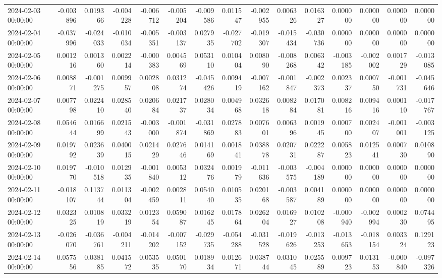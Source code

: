 \begin{tabular}{lrrrrrrrrrrrrrr}
2024-02-03 00:00:00 & -0.003896 & 0.019366 & -0.004228 & -0.006712 & -0.005204 & -0.009586 & 0.011547 & -0.002955 & 0.006326 & 0.016327 & 0.000000 & 0.000000 & 0.000000 & 0.000000 \\
2024-02-04 00:00:00 & -0.037996 & -0.024033 & -0.010034 & -0.005351 & -0.003137 & 0.027935 & -0.027702 & -0.019307 & -0.015434 & -0.030736 & 0.000000 & 0.000000 & 0.000000 & 0.000000 \\
2024-02-05 00:00:00 & 0.001216 & 0.001360 & 0.002214 & -0.000383 & 0.004569 & 0.053110 & 0.010404 & 0.008090 & -0.008268 & 0.006342 & -0.003185 & -0.002002 & 0.001729 & -0.013085 \\
2024-02-06 00:00:00 & 0.008871 & -0.001275 & 0.009957 & 0.002808 & 0.031274 & -0.045426 & 0.009419 & -0.007162 & -0.001847 & -0.002373 & 0.002337 & 0.000750 & -0.001731 & -0.045646 \\
2024-02-07 00:00:00 & 0.007798 & 0.022410 & 0.028540 & 0.020684 & 0.021737 & 0.028034 & 0.004968 & 0.032618 & 0.008284 & 0.017081 & 0.008216 & 0.009416 & 0.000110 & -0.017767 \\
2024-02-08 00:00:00 & 0.054644 & 0.016699 & 0.021543 & -0.003000 & -0.001874 & -0.031869 & 0.027883 & 0.007601 & 0.006396 & 0.001945 & 0.000700 & 0.002407 & -0.001001 & -0.003125 \\
2024-02-09 00:00:00 & 0.019792 & 0.023639 & 0.040015 & 0.021429 & 0.027646 & 0.014169 & 0.001841 & 0.038878 & 0.020731 & 0.022287 & 0.005823 & 0.012541 & 0.000730 & 0.010890 \\
2024-02-10 00:00:00 & 0.019770 & -0.010518 & 0.012935 & -0.001840 & 0.005312 & 0.032476 & 0.001979 & -0.011636 & -0.003575 & -0.004189 & 0.000000 & 0.000000 & 0.000000 & 0.000000 \\
2024-02-11 00:00:00 & -0.018107 & 0.113744 & 0.011304 & -0.002459 & 0.002811 & 0.054040 & 0.010535 & 0.020168 & -0.003587 & 0.004189 & 0.000000 & 0.000000 & 0.000000 & 0.000000 \\
2024-02-12 00:00:00 & 0.032325 & 0.010819 & 0.033219 & 0.012354 & 0.059087 & 0.016245 & 0.017864 & 0.026204 & 0.016927 & 0.010208 & -0.000940 & -0.002994 & 0.000230 & 0.074495 \\
2024-02-13 00:00:00 & -0.026070 & -0.036761 & -0.004211 & -0.014202 & -0.007152 & -0.029735 & -0.054288 & -0.031528 & -0.019626 & -0.013253 & -0.013653 & -0.018154 & 0.003324 & 0.129123 \\
2024-02-14 00:00:00 & 0.057556 & 0.038185 & 0.041572 & 0.053535 & 0.050170 & 0.018934 & 0.012671 & 0.038744 & 0.031045 & 0.025589 & 0.009723 & 0.013153 & -0.000840 & -0.097326 \\

\end{tabular}
